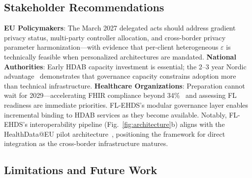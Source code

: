 \documentclass[conference]{IEEEtran}
\begin{document}
\subsection{Stakeholder Recommendations}

\textbf{EU Policymakers}: The March 2027 delegated acts should address gradient privacy status, multi-party controller allocation, and cross-border privacy parameter harmonization---with evidence that per-client heterogeneous $\varepsilon$ is technically feasible when personalized architectures are mandated. \textbf{National Authorities}: Early HDAB capacity investment is essential; the 2--3 year Nordic advantage~\cite{tehdas2024ready} demonstrates that governance capacity constrains adoption more than technical infrastructure. \textbf{Healthcare Organizations}: Preparation cannot wait for 2029---accelerating FHIR compliance beyond 34\%~\cite{hussein2025interop} and assessing FL readiness are immediate priorities. FL-EHDS's modular governance layer enables incremental binding to HDAB services as they become available. Notably, FL-EHDS's interoperability pipeline (Fig.~\ref{fig:architecture}b) aligns with the HealthData@EU pilot architecture~\cite{christiansen2025pilot}, positioning the framework for direct integration as the cross-border infrastructure matures.

\subsection{Limitations and Future Work}
\end{document}
